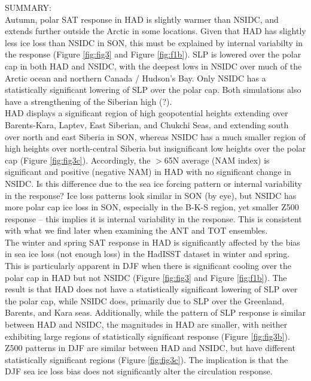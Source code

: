 \documentclass[twocol]{ametsoc}
\begin{document}
SUMMARY:\\
Autumn, polar SAT response in HAD is slightly warmer than NSIDC, and extends further outside the Arctic in some locations. Given that HAD has slightly less ice loss than NSIDC in SON, this must be explained by internal variabilty in the response (Figure \ref{fig:fig3} and Figure \ref{fig:f1b}). SLP is lowered over the polar cap in both HAD and NSIDC, with the deepest lows in NSIDC over much of the Arctic ocean and northern Canada / Hudson's Bay. Only NSIDC has a statistically significant lowering of SLP over the polar cap. Both simulations also have a strengthening of the Siberian high (?).  \\

HAD displays a significant region of high geopotential heights extending over Barents-Kara, Laptev, East Siberian, and Chukchi Seas, and extending south over north and east Siberia in SON, whereas NSIDC has a much smaller region of high heights over north-central Siberia but insignificant low heights over the polar cap (Figure \ref{fig:fig3c}). Accordingly, the $>$65N average (NAM index) is significant and positive (negative NAM) in HAD with no significant change in NSIDC. Is this difference due to the sea ice forcing pattern or internal variability in the response? Ice loss patterns look similar in SON (by eye), but NSIDC has more polar cap ice loss in SON, especially in the B-K-S region, yet smaller Z500 response -- this implies it is internal variability in the response. This is consistent with what we find later when examining the ANT and TOT ensembles.\\

The winter and spring SAT response in HAD is significantly affected by the bias in sea ice loss (not enough loss) in the HadISST dataset in winter and spring. This is particularly apparent in DJF when there is significant cooling over the polar cap in HAD but not NSIDC (Figure \ref{fig:fig3} and Figure \ref{fig:f1b}). The result is that HAD does not have a statistically significant lowering of SLP over the polar cap, while NSIDC does, primarily due to SLP over the Greenland, Barents, and Kara seas. Additionally, while the pattern of SLP response is similar between HAD and NSIDC, the magnitudes in HAD are smaller, with neither exhibiting large regions of statistically significant response (Figure \ref{fig:fig3b}). Z500 patterns in DJF are similar between HAD and NSIDC, but have different statistically significant regions (Figure \ref{fig:fig3c}). The implication is that the DJF sea ice loss bias does not significantly alter the circulation response. \\
\end{document}
